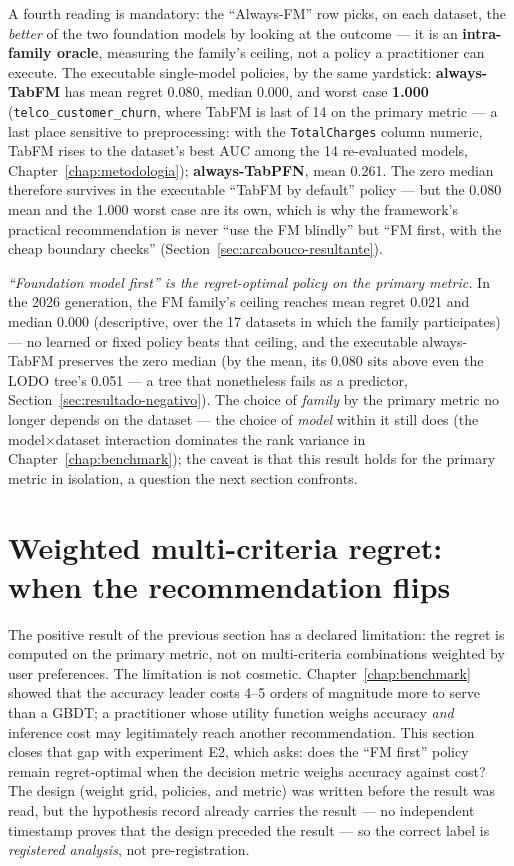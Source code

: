 A fourth reading is mandatory: the ``Always-FM'' row picks, on each
dataset, the \emph{better} of the two foundation models by looking
at the outcome --- it is an \textbf{intra-family oracle}, measuring
the family's ceiling, not a policy a practitioner can execute. The
executable single-model policies, by the same yardstick:
\textbf{always-TabFM} has mean regret 0.080, median 0.000, and worst
case \textbf{1.000} (\texttt{telco\_customer\_churn}, where TabFM is
last of 14 on the primary metric --- a last place sensitive to
preprocessing: with the \texttt{TotalCharges} column numeric, TabFM
rises to the dataset's best AUC among the 14 re-evaluated models,
Chapter~\ref{chap:metodologia}); \textbf{always-TabPFN}, mean 0.261.
The zero median therefore survives in the executable ``TabFM by
default'' policy --- but the 0.080 mean and the 1.000 worst case are
its own, which is why the framework's practical recommendation is
never ``use the FM blindly'' but ``FM first, with the cheap boundary
checks'' (Section~\ref{sec:arcabouco-resultante}).

\emph{``Foundation model first'' is the regret-optimal policy on the
primary metric.} In the 2026 generation, the FM family's ceiling
reaches mean regret 0.021 and median 0.000 (descriptive, over the 17
datasets in which the family participates) --- no learned or fixed
policy beats that ceiling, and the executable always-TabFM preserves
the zero median (by the mean, its 0.080 sits above even the LODO
tree's 0.051 --- a tree that nonetheless fails as a predictor,
Section~\ref{sec:resultado-negativo}). The choice of \emph{family} by the primary metric no longer
depends on the dataset --- the choice of \emph{model} within it
still does (the model$\times$dataset interaction dominates the rank
variance in Chapter~\ref{chap:benchmark}); the caveat is that this
result holds for the primary metric in isolation, a question the
next section confronts.

\section{Weighted multi-criteria regret: when the recommendation flips}
\label{sec:regret-ponderado}

The positive result of the previous section has a declared
limitation: the regret is computed on the primary metric, not on
multi-criteria combinations weighted by user preferences. The
limitation is not cosmetic. Chapter~\ref{chap:benchmark} showed that
the accuracy leader costs 4--5 orders of magnitude more to serve
than a GBDT; a practitioner whose utility function weighs accuracy
\emph{and} inference cost may legitimately reach another
recommendation. This section closes that gap with experiment E2,
which asks: does the ``FM first'' policy remain regret-optimal when
the decision metric weighs accuracy against cost? The design (weight
grid, policies, and metric) was written before the result was read,
but the hypothesis record already carries the result --- no
independent timestamp proves that the design preceded the result ---
so the correct label is \emph{registered analysis}, not
pre-registration.

